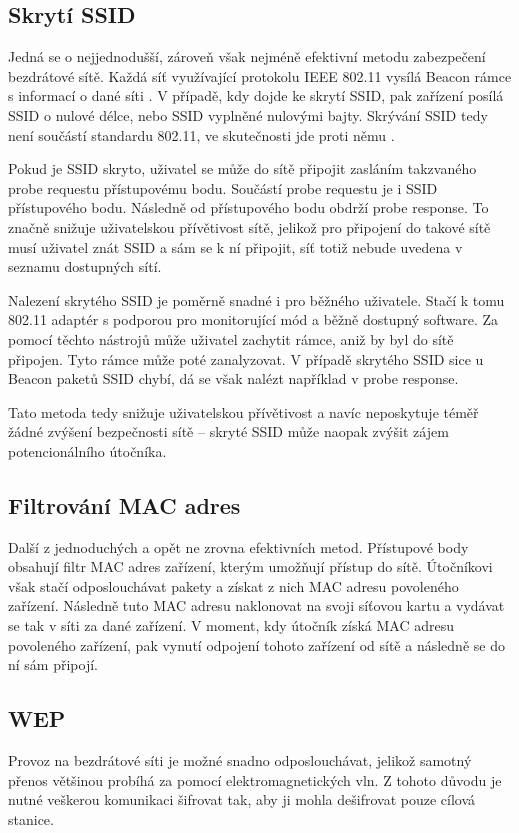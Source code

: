 \subsection{Skrytí SSID}
Jedná se o nejjednodušší, zároveň však nejméně efektivní metodu zabezpečení bezdrátové sítě. Každá síť využívající protokolu IEEE 802.11 vysílá Beacon rámce s informací o dané síti \cite{IdentifyingChannel}. V případě, kdy dojde ke skrytí SSID, pak zařízení posílá SSID o nulové délce, nebo SSID vyplněné nulovými bajty. Skrývání SSID tedy není součástí standardu 802.11, ve skutečnosti jde proti němu \cite{IEEE2016}.

Pokud je SSID skryto, uživatel se může do sítě připojit zasláním takzvaného probe requestu přístupovému bodu. Součástí probe requestu je i SSID přístupového bodu. Následně od přístupového bodu obdrží probe response. To značně snižuje uživatelskou přívětivost sítě, jelikož pro připojení do takové sítě musí uživatel znát SSID a sám se k ní připojit, síť totiž nebude uvedena v seznamu dostupných sítí.

Nalezení skrytého SSID je poměrně snadné i pro běžného uživatele. Stačí k tomu 802.11 adaptér s podporou pro monitorující mód a běžně dostupný software. Za pomocí těchto nástrojů může uživatel zachytit rámce, aniž by byl do sítě připojen. Tyto rámce může poté zanalyzovat. V případě skrytého SSID sice u Beacon paketů SSID chybí, dá se však nalézt například v probe response.

Tato metoda tedy snižuje uživatelskou přívětivost a navíc neposkytuje téměř žádné zvýšení bezpečnosti sítě -- skryté SSID může naopak zvýšit zájem potencionálního útočníka.

\subsection{Filtrování MAC adres}
Další z jednoduchých a opět ne zrovna efektivních metod. Přístupové body obsahují filtr MAC adres zařízení, kterým umožňují přístup do sítě. Útočníkovi však stačí odposlouchávat pakety a získat z nich MAC adresu povoleného zařízení. Následně tuto MAC adresu naklonovat na svoji síťovou kartu a vydávat se tak v síti za dané zařízení. V moment, kdy útočník získá MAC adresu povoleného zařízení, pak vynutí odpojení tohoto zařízení od sítě a následně se do ní sám připojí. 

\subsection{WEP}
Provoz na bezdrátové síti je možné snadno odposlouchávat, jelikož samotný přenos většinou probíhá za pomocí elektromagnetických vln. Z tohoto důvodu je nutné veškerou komunikaci šifrovat tak, aby ji mohla dešifrovat pouze cílová stanice. 

